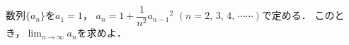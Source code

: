 \documentclass[../../main.tex]{subfiles}
\begin{document}
数列$\{ a_n \}$を$a_1=1$，
$\displaystyle a_n=1+\dfrac{1}{n^2}{a_{n-1}}^2$ $(n=2, \, 3, \, 4, \, \cdots\cdots)$で定める．
このとき，$\displaystyle\lim_{n\to\infty}a_n$を求めよ．
\end{document}
